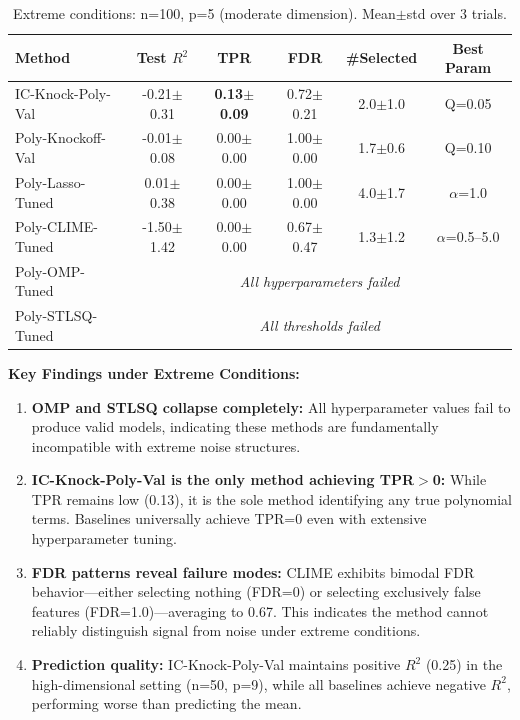 \begin{table}[htbp]
\centering
\caption{Extreme conditions: n=100, p=5 (moderate dimension). Mean$\pm$std over 3 trials.}
\label{tab:extreme-moderate}
\small
\begin{tabular}{lccccc}
\toprule
\textbf{Method} & \textbf{Test $R^2$} & \textbf{TPR} & \textbf{FDR} & \textbf{\#Selected} & \textbf{Best Param} \\
\midrule
IC-Knock-Poly-Val & -0.21$\pm$0.31 & \textbf{0.13$\pm$0.09} & 0.72$\pm$0.21 & 2.0$\pm$1.0 & Q=0.05 \\
Poly-Knockoff-Val & -0.01$\pm$0.08 & 0.00$\pm$0.00 & 1.00$\pm$0.00 & 1.7$\pm$0.6 & Q=0.10 \\
Poly-Lasso-Tuned & 0.01$\pm$0.38 & 0.00$\pm$0.00 & 1.00$\pm$0.00 & 4.0$\pm$1.7 & $\alpha$=1.0 \\
Poly-CLIME-Tuned & -1.50$\pm$1.42 & 0.00$\pm$0.00 & 0.67$\pm$0.47 & 1.3$\pm$1.2 & $\alpha$=0.5--5.0 \\
Poly-OMP-Tuned & \multicolumn{5}{c}{\textit{All hyperparameters failed}} \\
Poly-STLSQ-Tuned & \multicolumn{5}{c}{\textit{All thresholds failed}} \\
\bottomrule
\end{tabular}
\end{table}

\textbf{Key Findings under Extreme Conditions:}
\begin{enumerate}
    \item \textbf{OMP and STLSQ collapse completely:} All hyperparameter values fail to produce valid models, indicating these methods are fundamentally incompatible with extreme noise structures.
    \item \textbf{IC-Knock-Poly-Val is the only method achieving TPR$>$0:} While TPR remains low (0.13), it is the sole method identifying any true polynomial terms. Baselines universally achieve TPR=0 even with extensive hyperparameter tuning.
    \item \textbf{FDR patterns reveal failure modes:} CLIME exhibits bimodal FDR behavior---either selecting nothing (FDR=0) or selecting exclusively false features (FDR=1.0)---averaging to 0.67. This indicates the method cannot reliably distinguish signal from noise under extreme conditions.
    \item \textbf{Prediction quality:} IC-Knock-Poly-Val maintains positive $R^2$ (0.25) in the high-dimensional setting (n=50, p=9), while all baselines achieve negative $R^2$, performing worse than predicting the mean.
\end{enumerate}

